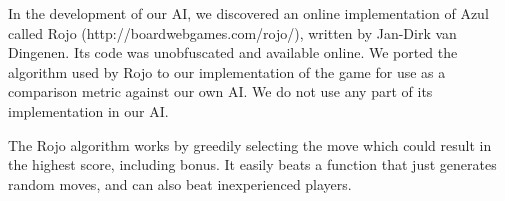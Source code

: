 \documentclass[12pt]{article}
\begin{document}
In the development of our AI, we discovered an online implementation of Azul called Rojo (http://boardwebgames.com/rojo/), written by Jan-Dirk van Dingenen. Its code was unobfuscated and available online. We ported the algorithm used by Rojo to our implementation of the game for use as a comparison metric against our own AI. We do not use any part of its implementation in our AI.

The Rojo algorithm works by greedily selecting the move which could result in the highest score, including bonus. It easily beats a function that just generates random moves, and can also beat inexperienced players.
\end{document}
